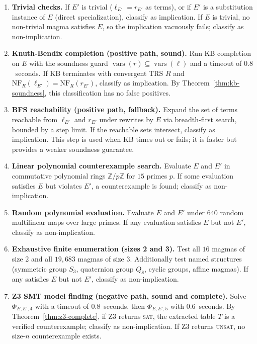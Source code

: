 \begin{enumerate}[(1)]
  \item \textbf{Trivial checks.}
        If $E'$ is trivial ($\ell_{E'} = r_{E'}$ as terms), or if $E'$ is a
        substitution instance of $E$ (direct specialization), classify as implication.
        If $E$ is trivial, no non-trivial magma satisfies $E$, so the implication
        vacuously fails; classify as non-implication.

  \item \textbf{Knuth-Bendix completion (positive path, sound).}
        Run KB completion on $E$ with the soundness guard
        $\operatorname{vars}(r) \subseteq \operatorname{vars}(\ell)$ and a timeout of $0.8$~seconds.
        If KB terminates with convergent TRS $R$ and
        $\mathrm{NF}_R(\ell_{E'}) = \mathrm{NF}_R(r_{E'})$, classify as implication.
        By Theorem~\ref{thm:kb-soundness}, this classification has no false positives.

  \item \textbf{BFS reachability (positive path, fallback).}
        Expand the set of terms reachable from $\ell_{E'}$ and $r_{E'}$ under
        rewrites by $E$ via breadth-first search, bounded by a step limit.  If the
        reachable sets intersect, classify as implication.  This step is used when
        KB times out or fails; it is faster but provides a weaker soundness guarantee.

  \item \textbf{Linear polynomial counterexample search.}
        Evaluate $E$ and $E'$ in commutative polynomial rings $\mathbb{Z}/p\mathbb{Z}$
        for $15$ primes $p$.  If some evaluation satisfies $E$ but violates $E'$,
        a counterexample is found; classify as non-implication.

  \item \textbf{Random polynomial evaluation.}
        Evaluate $E$ and $E'$ under $640$ random multilinear maps over large primes.
        If any evaluation satisfies $E$ but not $E'$, classify as non-implication.

  \item \textbf{Exhaustive finite enumeration (sizes 2 and 3).}
        Test all $16$ magmas of size 2 and all $19{,}683$ magmas of size 3.
        Additionally test named structures (symmetric group $S_3$, quaternion group
        $Q_8$, cyclic groups, affine magmas).  If any satisfies $E$ but not $E'$,
        classify as non-implication.

  \item \textbf{Z3 SMT model finding (negative path, sound and complete).}
        Solve $\Phi_{E,E',4}$ with a timeout of $0.8$~seconds, then $\Phi_{E,E',5}$
        with $0.6$~seconds.  By Theorem~\ref{thm:z3-complete}, if Z3 returns
        \textsc{sat}, the extracted table $T$ is a verified counterexample; classify
        as non-implication.  If Z3 returns \textsc{unsat}, no size-$n$ counterexample
        exists.


\end{enumerate}
